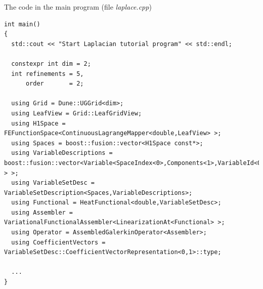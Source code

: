 \documentclass[11pt]{article}
\begin{document}
The code in the main program (file {\em laplace.cpp})

\begin{lstlisting}
int main()
{
  std::cout << "Start Laplacian tutorial program" << std::endl;

  constexpr int dim = 2;
  int refinements = 5,
      order       = 2;

  using Grid = Dune::UGGrid<dim>;
  using LeafView = Grid::LeafGridView;
  using H1Space = FEFunctionSpace<ContinuousLagrangeMapper<double,LeafView> >;
  using Spaces = boost::fusion::vector<H1Space const*>;
  using VariableDescriptions = boost::fusion::vector<Variable<SpaceIndex<0>,Components<1>,VariableId<0> > >;
  using VariableSetDesc = VariableSetDescription<Spaces,VariableDescriptions>;
  using Functional = HeatFunctional<double,VariableSetDesc>;
  using Assembler = VariationalFunctionalAssembler<LinearizationAt<Functional> >;
  using Operator = AssembledGalerkinOperator<Assembler>;
  using CoefficientVectors = VariableSetDesc::CoefficientVectorRepresentation<0,1>::type;

  ...
}
\end{lstlisting}
\end{document}
